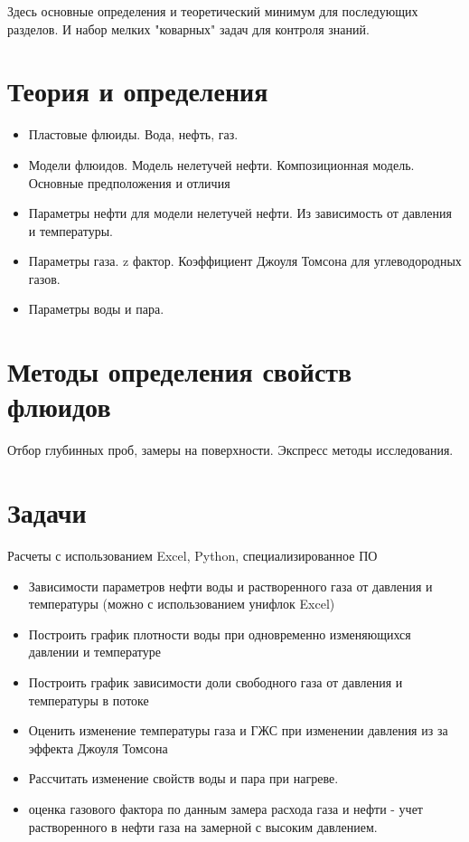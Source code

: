 Здесь основные определения и теоретический минимум для последующих разделов. 
И набор мелких "коварных" задач для контроля знаний.
\section{Теория и определения}
\begin{itemize}
    \item Пластовые флюиды. Вода, нефть, газ.
    \item Модели флюидов. Модель нелетучей нефти. Композиционная модель. Основные предположения и отличия
    \item Параметры нефти для модели нелетучей нефти. Из зависимость от давления и температуры. 
    \item Параметры газа. z фактор. Коэффициент Джоуля Томсона для углеводородных газов. 
    \item Параметры воды и пара.
    
\end{itemize}
\section{Методы определения свойств флюидов}
Отбор глубинных проб, замеры на поверхности. Экспресс методы исследования.
\section{Задачи}
Расчеты с использованием Excel, Python, специализированное ПО
\begin{itemize}
    \item Зависимости параметров нефти воды и растворенного газа от давления и температуры (можно с использованием унифлок Excel)
    \item Построить график плотности воды при одновременно изменяющихся давлении и температуре
    \item Построить график зависимости доли свободного газа  от давления и температуры в потоке
    \item Оценить изменение температуры газа и ГЖС при изменении давления из за эффекта Джоуля Томсона
    \item Рассчитать изменение свойств воды и пара при нагреве.
    \item оценка газового фактора по данным замера расхода газа и нефти - учет растворенного в нефти газа на замерной с высоким давлением.

\end{itemize}
    